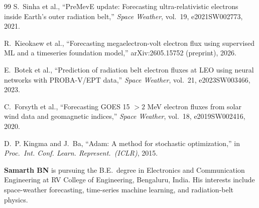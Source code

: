﻿\documentclass{ieeeaccess}
\begin{document}
\begin{thebibliography}{99}
S.~Sinha et al., ``PreMevE update: Forecasting ultra-relativistic electrons
inside Earth's outer radiation belt,'' \emph{Space Weather}, vol.~19,
e2021SW002773, 2021.

R.~Kieokaew et al., ``Forecasting megaelectron-volt electron flux using
supervised ML and a timeseries foundation model,'' arXiv:2605.15752 (preprint), 2026.

E.~Botek et al., ``Prediction of radiation belt electron fluxes at LEO using
neural networks with PROBA-V/EPT data,'' \emph{Space Weather}, vol.~21,
e2023SW003466, 2023.

C.~Forsyth et al., ``Forecasting GOES 15 \(>2\) MeV electron fluxes from
solar wind data and geomagnetic indices,'' \emph{Space Weather}, vol.~18,
e2019SW002416, 2020.

D.~P. Kingma and J.~Ba, ``Adam: A method for stochastic optimization,''
in \emph{Proc.\ Int. Conf. Learn. Represent.\ (ICLR)}, 2015.




\end{thebibliography}

\vspace{3ex}
\noindent\textbf{Samarth BN} is pursuing the B.E.\ degree in Electronics and
Communication Engineering at RV College of Engineering, Bengaluru, India.
His interests include space-weather forecasting, time-series machine learning,
and radiation-belt physics.

\EOD
\end{document}
